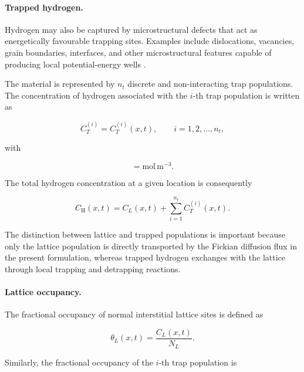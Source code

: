 \paragraph{Trapped hydrogen.}

Hydrogen may also be captured by microstructural defects that act as
energetically favourable trapping sites. Examples include
dislocations, vacancies, grain boundaries, interfaces, and other
microstructural features capable of producing local potential-energy
wells \cite{Darken1949,McNabb1963,Oriani1970,Krom2000}.

The material is represented by $n_t$ discrete and non-interacting trap
populations. The concentration of hydrogen associated with the
$i$-th trap population is written as

\begin{equation}
C_T^{(i)}=C_T^{(i)}(x,t),
\qquad
i=1,2,\ldots,n_t,
\label{eq:ch3_CT_definition}
\end{equation}

with

\begin{equation}
[C_T^{(i)}]=\mathrm{mol\,m^{-3}}.
\end{equation}

The total hydrogen concentration at a given location is consequently

\begin{equation}
C_{\mathrm{H}}(x,t)
=
C_L(x,t)
+
\sum_{i=1}^{n_t} C_T^{(i)}(x,t).
\label{eq:ch3_total_hydrogen}
\end{equation}

The distinction between lattice and trapped populations is important
because only the lattice population is directly transported by the
Fickian diffusion flux in the present formulation, whereas trapped
hydrogen exchanges with the lattice through local trapping and
detrapping reactions.

\paragraph{Lattice occupancy.}

The fractional occupancy of normal interstitial lattice sites is
defined as

\begin{equation}
\theta_L(x,t)
=
\frac{C_L(x,t)}{N_L}.
\label{eq:ch3_theta_L}
\end{equation}

Similarly, the fractional occupancy of the $i$-th trap population is

